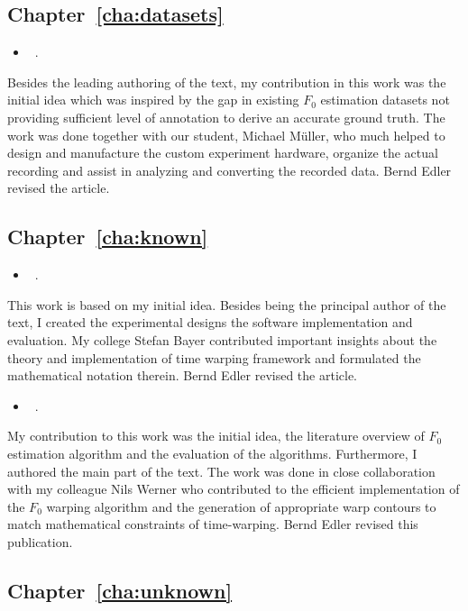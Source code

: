 \subsection*{Chapter~\ref{cha:datasets}}

\begin{itemize}
  \item[\cite{stoeter15acm}] ~.
\end{itemize}
\noindent
Besides the leading authoring of the text, my contribution in this work was the initial idea which was inspired by the gap in existing $F_0$ estimation datasets not providing sufficient level of annotation to derive an accurate ground truth.
The work was done together with our student, Michael Müller, who much helped to design and manufacture the custom experiment hardware, organize the actual recording and assist in analyzing and converting the recorded data. Bernd Edler revised the article.

\subsection*{Chapter~\ref{cha:known}}

\begin{itemize}
  \item[\cite{stoeter14}] ~.
\end{itemize}
\noindent
This work is based on my initial idea. Besides being the principal author of the text, I created the experimental designs the software implementation and evaluation.
My college Stefan Bayer contributed important insights about the theory and implementation of time warping framework and formulated the mathematical notation therein. Bernd Edler revised the article.

\begin{itemize}
  \item[\cite{stoeter15icassp}] ~.
\end{itemize}
\noindent
My contribution to this work was the initial idea, the literature overview of $F_0$ estimation algorithm and the evaluation of the algorithms. 
Furthermore, I authored the main part of the text.
The work was done in close collaboration with my colleague Nils Werner who contributed to the efficient implementation of the $F_0$ warping algorithm and the generation of appropriate warp contours to match mathematical constraints of time-warping. Bernd Edler revised this publication.

\subsection*{Chapter~\ref{cha:unknown}}

